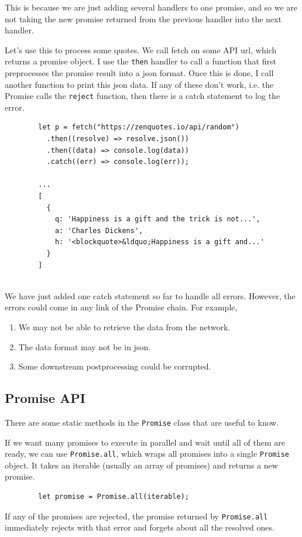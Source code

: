 \documentclass{article}
\newcounter{definition}[section]
\newcounter{example}[section]
\begin{document}
    This is because we are just adding several handlers to one promise, and so we are not taking the new promise returned from the previous handler into the next handler. 

    \begin{example}
      \label{ex:quotes-api}
      Let's use this to process some quotes. We call fetch on some API url, which returns a promise object. I use the \texttt{then} handler to call a function that first preprocesses the promise result into a json format. Once this is done, I call another function to print this json data. If any of these don't work, i.e. the Promise calls the \texttt{reject} function, then there is a catch statement to log the error. 
      \begin{lstlisting}
        let p = fetch("https://zenquotes.io/api/random")
          .then((resolve) => resolve.json())
          .then((data) => console.log(data))
          .catch((err) => console.log(err)); 

        ... 
        [
          {
            q: 'Happiness is a gift and the trick is not...', 
            a: 'Charles Dickens',
            h: '<blockquote>&ldquo;Happiness is a gift and...'
          }
        ]
        
      \end{lstlisting}
    \end{example}

    We have just added one catch statement so far to handle all errors. However, the errors could come in any link of the Promise chain. For example, 
    \begin{enumerate}
      \item We may not be able to retrieve the data from the network. 
      \item The data format may not be in json. 
      \item Some downstream postprocessing could be corrupted. 
    \end{enumerate}

  \subsection{Promise API}

    There are some static methods in the \texttt{Promise} class that are useful to know. 

    \begin{definition}
      \label{def:promise-all}
      If we want many promises to execute in parallel and wait until all of them are ready, we can use \texttt{Promise.all}, which wraps all promises into a single \texttt{Promise} object. It takes an iterable (usually an array of promises) and returns a new promise. 
      
      \begin{lstlisting}
        let promise = Promise.all(iterable); 
      \end{lstlisting}

      If any of the promises are rejected, the promise returned by \texttt{Promise.all} immediately rejects with that error and forgets about all the resolved ones. 
    \end{definition}
\end{document}
